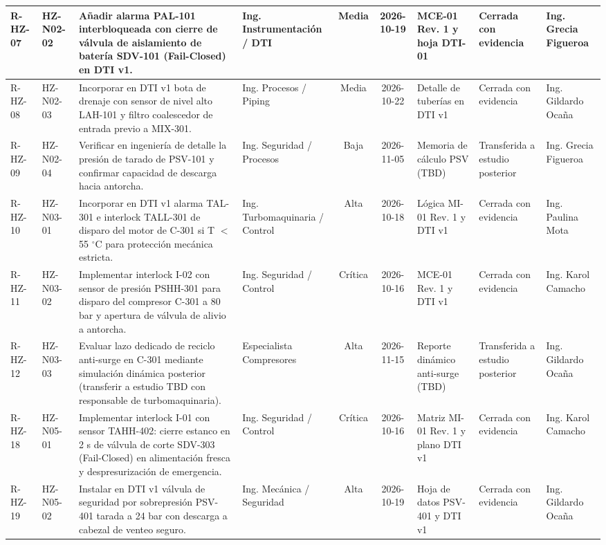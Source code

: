 \documentclass[10pt,letterpaper]{article}
\begin{document}
\begin{table}[H]
\begin{tabularx}{\textwidth}{|l|l|X|p{2.6cm}|c|c|p{2.6cm}|p{1.8cm}|p{2.2cm}|}
R-HZ-07 & HZ-N02-02 & Añadir alarma PAL-101 interbloqueada con cierre de válvula de aislamiento de batería SDV-101 (Fail-Closed) en DTI v1. & Ing. Instrumentación / DTI & Media & 2026-10-19 & MCE-01 Rev. 1 y hoja DTI-01 & Cerrada con evidencia & Ing. Grecia Figueroa \\ \hline
R-HZ-08 & HZ-N02-03 & Incorporar en DTI v1 bota de drenaje con sensor de nivel alto LAH-101 y filtro coalescedor de entrada previo a MIX-301. & Ing. Procesos / Piping & Media & 2026-10-22 & Detalle de tuberías en DTI v1 & Cerrada con evidencia & Ing. Gildardo Ocaña \\ \hline
R-HZ-09 & HZ-N02-04 & Verificar en ingeniería de detalle la presión de tarado de PSV-101 y confirmar capacidad de descarga hacia antorcha. & Ing. Seguridad / Procesos & Baja & 2026-11-05 & Memoria de cálculo PSV (TBD) & Transferida a estudio posterior & Ing. Grecia Figueroa \\ \hline
R-HZ-10 & HZ-N03-01 & Incorporar en DTI v1 alarma TAL-301 e interlock TALL-301 de disparo del motor de C-301 si T $<$ 55 $^\circ$C para protección mecánica estricta. & Ing. Turbomaquinaria / Control & Alta & 2026-10-18 & Lógica MI-01 Rev. 1 y DTI v1 & Cerrada con evidencia & Ing. Paulina Mota \\ \hline
R-HZ-11 & HZ-N03-02 & Implementar interlock I-02 con sensor de presión PSHH-301 para disparo del compresor C-301 a 80 bar y apertura de válvula de alivio a antorcha. & Ing. Seguridad / Control & Crítica & 2026-10-16 & MCE-01 Rev. 1 y DTI v1 & Cerrada con evidencia & Ing. Karol Camacho \\ \hline
R-HZ-12 & HZ-N03-03 & Evaluar lazo dedicado de reciclo anti-surge en C-301 mediante simulación dinámica posterior (transferir a estudio TBD con responsable de turbomaquinaria). & Especialista Compresores & Alta & 2026-11-15 & Reporte dinámico anti-surge (TBD) & Transferida a estudio posterior & Ing. Gildardo Ocaña \\ \hline
R-HZ-18 & HZ-N05-01 & Implementar interlock I-01 con sensor TAHH-402: cierre estanco en 2 s de válvula de corte SDV-303 (Fail-Closed) en alimentación fresca y despresurización de emergencia. & Ing. Seguridad / Control & Crítica & 2026-10-16 & Matriz MI-01 Rev. 1 y plano DTI v1 & Cerrada con evidencia & Ing. Karol Camacho \\ \hline
R-HZ-19 & HZ-N05-02 & Instalar en DTI v1 válvula de seguridad por sobrepresión PSV-401 tarada a 24 bar con descarga a cabezal de venteo seguro. & Ing. Mecánica / Seguridad & Alta & 2026-10-19 & Hoja de datos PSV-401 y DTI v1 & Cerrada con evidencia & Ing. Gildardo Ocaña \\ \hline

\end{tabularx}
\end{table}
\end{document}
